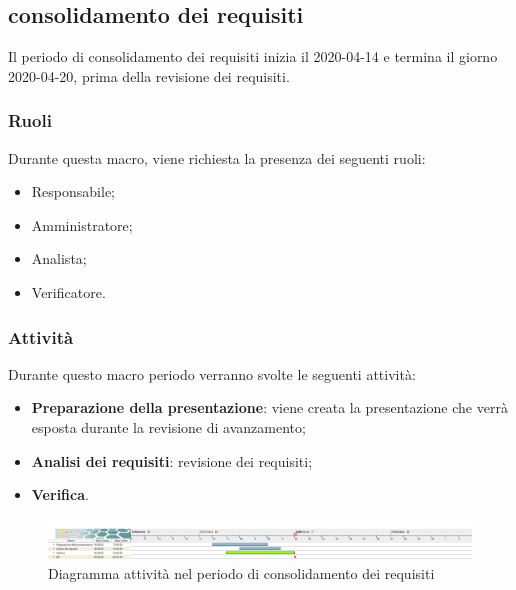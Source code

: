 \documentclass[../piano-di-progetto.tex]{subfiles}
\begin{document}
\subsection{consolidamento dei requisiti}
Il periodo di consolidamento dei requisiti inizia il 2020-04-14 e termina il giorno 2020-04-20, prima della revisione dei requisiti. 

\subsubsection{Ruoli}
Durante questa macro, viene richiesta la presenza dei seguenti ruoli:
\begin{itemize}
    \item Responsabile;
    \item Amministratore;
    \item Analista;
    \item Verificatore.
\end{itemize}

\subsubsection{Attività}
Durante questo macro periodo verranno svolte le seguenti attività:
\begin{itemize}
    \item \textbf{Preparazione della presentazione}: viene creata la presentazione che verrà esposta durante la revisione di avanzamento;
    \item \textbf{Analisi dei requisiti}: revisione dei requisiti;
    \item \textbf{Verifica}.
\end{itemize}


\newpage
\begin{landscape}
    \begin{figure}[H]
        \centering
        \includegraphics[width=24cm]{img/consolidamento.png}
        \caption{Diagramma attività nel periodo di consolidamento dei requisiti}
      \end{figure}
\end{landscape}
\end{document}
